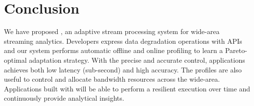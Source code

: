 \section{Conclusion}
\label{sec:conclusion}

We have proposed \sysname{}, an adaptive stream processing system for wide-area
streaming analytics. Developers express data degradation operations with
\maybe{} APIs and our system performs automatic offline and online profiling to
learn a Pareto-optimal adaptation strategy. With the precise and accurate
control, \sysname{} applications achieves both low latency (sub-second) and high
accuracy. The profiles are also useful to control and allocate bandwidth
resources across the wide-area. Applications built with \sysname{} will be able
to perform a resilient execution over time and continuously provide analytical
insights.

